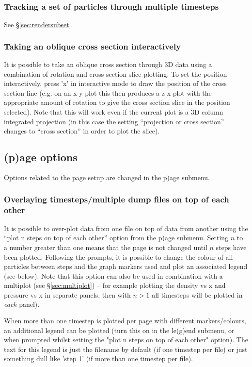 \documentclass[a4paper,10pt]{article}
\begin{document}
\subsubsection{ Tracking a set of particles through multiple timesteps}
 See \S\ref{sec:rendersubset}.

\subsubsection{ Taking an oblique cross section interactively}
 \label{sec:obliquexsec}
 It is possible to take an oblique cross section through 3D data using a combination of rotation and cross section slice plotting. To set the position interactively, press 'x' in interactive mode to draw the position of the cross section line (e.g. on an x-y plot this then produces a z-x plot with the appropriate amount of rotation to give the cross section slice in the position selected). Note that this will work even if the current plot is a 3D column integrated projection (in this case the setting ``projection or cross section'' changes to ``cross section'' in order to plot the slice). 

\subsection{(p)age options}%
\label{sec:optionspage}
 Options related to the page setup are changed in the p)age submenu.

\subsubsection{ Overlaying timesteps/multiple dump files on top of each other}
\label{sec:nstepsontopofeachother}
 It is possible to over-plot data from one file on top of data from another using the ``plot n steps on top of each other'' option from the p)age submenu. Setting $n$ to a number greater than one means that the page is not changed until $n$ steps have been plotted. Following the prompts, it is possible to change the colour of all particles between steps and the graph markers used and plot an associated legend (see below). Note that this option can also be used in combination with a multiplot (see \S\ref{sec:multiplot}) -- for example plotting the density vs x and pressure vs x in separate panels, then with $n > 1$ all timesteps will be plotted in \emph{each} panel). 

When more than one timestep is plotted per page with different markers/colours, an additional legend can be
plotted (turn this on in the le(g)end submenu, or when prompted whilst setting the "plot n steps on top of each other" option). The text for this legend is just the filename by default (if one timestep per file) or just something dull like 'step 1' (if more than one timestep per file). 
\end{document}
